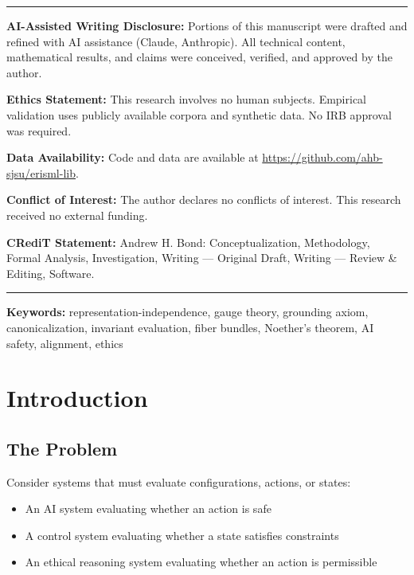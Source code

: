 \documentclass[12pt]{article}
\theoremstyle{definition}
\theoremstyle{remark}
\begin{document}
\begin{titlepage}
\vfill

\noindent\rule{\linewidth}{0.4pt}
\small
\noindent\textbf{AI-Assisted Writing Disclosure:} Portions of this manuscript were drafted and refined with AI assistance (Claude, Anthropic). All technical content, mathematical results, and claims were conceived, verified, and approved by the author.

\noindent\textbf{Ethics Statement:} This research involves no human subjects. Empirical validation uses publicly available corpora and synthetic data. No IRB approval was required.

\noindent\textbf{Data Availability:} Code and data are available at \url{https://github.com/ahb-sjsu/erisml-lib}.

\noindent\textbf{Conflict of Interest:} The author declares no conflicts of interest. This research received no external funding.

\noindent\textbf{CRediT Statement:} Andrew H. Bond: Conceptualization, Methodology, Formal Analysis, Investigation, Writing --- Original Draft, Writing --- Review \& Editing, Software.
\noindent\rule{\linewidth}{0.4pt}
\normalsize

\end{titlepage}

\noindent\textbf{Keywords:} representation-independence, gauge theory, grounding axiom, canonicalization, invariant evaluation, fiber bundles, Noether's theorem, AI safety, alignment, ethics

\tableofcontents

\newpage

\section{Introduction}

\subsection{The Problem}

Consider systems that must evaluate configurations, actions, or states:

\begin{itemize}
    \item An AI system evaluating whether an action is safe
    \item A control system evaluating whether a state satisfies constraints
    \item An ethical reasoning system evaluating whether an action is permissible
\end{itemize}
\end{document}
